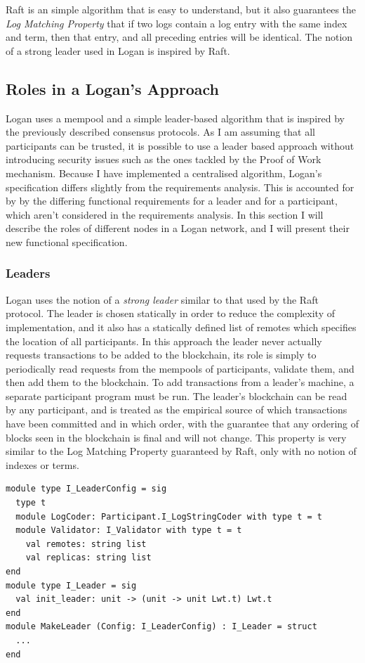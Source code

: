\documentclass[12pt,a4paper,twoside,openright]{report}
\begin{document}
	Raft is an simple algorithm that is easy to understand, but it also guarantees the \textit{Log Matching Property} that if two logs contain a log entry with the same index and term, then that entry, and all preceding entries will be identical.
	The notion of a strong leader used in Logan is inspired by Raft.

	\subsection{Roles in a Logan's Approach}
	Logan uses a mempool and a simple leader-based algorithm that is inspired by the previously described consensus protocols.
	As I am assuming that all participants can be trusted, it is possible to use a leader based approach without introducing security issues such as the ones tackled by the Proof of Work mechanism. 
	Because I have implemented a centralised algorithm, Logan's specification differs slightly from the requirements analysis.
	This is accounted for by by the differing functional requirements for a leader and for a participant, which aren't considered in the requirements analysis.
	In this section I will describe the roles of different nodes in a Logan network, and I will present their new functional specification.
	
	\subsubsection*{Leaders}
	Logan uses the notion of a \textit{strong leader} similar to that used by the Raft protocol. 
	The leader is chosen statically in order to reduce the complexity of implementation, and it also has a statically defined list of remotes which specifies the location of all participants.
	In this approach the leader never actually requests transactions to be added to the blockchain, its role is simply to periodically read requests from the mempools of participants, validate them, and then add them to the blockchain.
	To add transactions from a leader's machine, a separate participant program must be run.
	The leader's blockchain can be read by any participant, and is treated as the empirical source of which transactions have been committed and in which order, with the guarantee that any ordering of blocks seen in the blockchain is final and will not change.
	This property is very similar to the Log Matching Property guaranteed by Raft, only with no notion of indexes or terms.\\

	\begin{lstlisting}[caption={Leader Specification},label={lst:leaderspec}]
module type I_LeaderConfig = sig
  type t
  module LogCoder: Participant.I_LogStringCoder with type t = t   
  module Validator: I_Validator with type t = t 
	val remotes: string list
	val replicas: string list
end
module type I_Leader = sig
  val init_leader: unit -> (unit -> unit Lwt.t) Lwt.t
end
module MakeLeader (Config: I_LeaderConfig) : I_Leader = struct
  ...
end
	\end{lstlisting}
\end{document}
